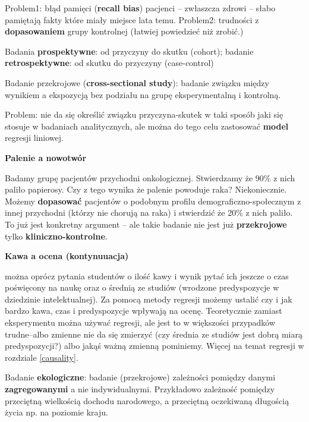 \documentclass[
  openany]{book}
\begin{document}
Problem1: błąd pamięci (\textbf{recall bias}) pacjenci -- zwłaszcza zdrowi -- słabo pamiętają
fakty które miały miejsce lata temu.
Problem2: trudności z \textbf{dopasowaniem} grupy kontrolnej (łatwiej powiedzieć niż zrobić.)

Badania \textbf{prospektywne}: od przyczyny do skutku (cohort); badanie \textbf{retrospektywne}:
od skutku do przyczyny (case-control)

Badanie przekrojowe (\textbf{cross-sectional study}): badanie związku między wynikiem a ekspozycją
bez podziału na grupę eksperymentalną i kontrolną.

Problem: nie da się określić związku przyczyna-skutek w taki sposób jaki się stosuje w badaniach analitycznych,
ale można do tego celu zastosować \textbf{model} regresji liniowej.

\begin{example}
\textbf{Palenie a nowotwór}

Badamy grupę pacjentów przychodni onkologicznej. Stwierdzamy że 90\% z nich paliło
papierosy. Czy z tego wynika że palenie powoduje raka? Niekoniecznie. Możemy \textbf{dopasować}
pacjentów o podobnym profilu demograficzno-społecznym z innej przychodni (którzy nie chorują na raka)
i stwierdzić że 20\% z nich paliło.
To już jest konkretny argument -- ale takie badanie nie jest już \textbf{przekrojowe}
tylko \textbf{kliniczno-kontrolne}.
\end{example}

\begin{example}
\textbf{Kawa a ocena (kontynuuacja)}

można oprócz pytania studentów o ilość kawy i wynik pytać ich jeszcze o czas poświęcony
na naukę oraz o średnią ze studiów (wrodzone predyspozycje w dziedzinie intelektualnej).
Za pomocą metody regresji możemy ustalić czy i jak bardzo kawa, czas i predyspozycje
wpływają na ocenę. Teoretycznie zamiast eksperymentu można używać regresji, ale jest to w większości
przypadków trudne--albo zmienne nie da się zmierzyć (czy średnia ze studiów jest dobrą miarą predyspozycji?)
albo jakąś ważną zmienną pominiemy. Więcej na temat regresji w rozdziale \ref{causality}.
\end{example}

Badanie \textbf{ekologiczne}: badanie (przekrojowe) zależności pomiędzy danymi \textbf{zagregowanymi} a nie indywidualnymi.
Przykładowo zależność pomiędzy przeciętną
wielkością dochodu narodowego, a przeciętną oczekiwaną długością życia np. na poziomie kraju.
\end{document}
